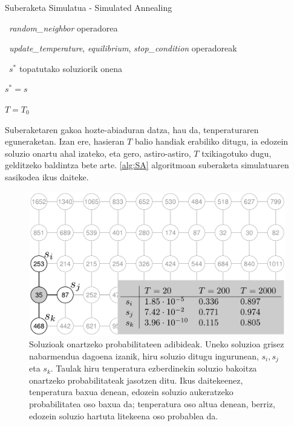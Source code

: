 \documentclass[eu]{ifirak}\usepackage[]{graphicx}\usepackage[]{color}
\begin{document}
\begin{ifalgorithm}[t]
\begin{ifpseudo}{Suberaketa Simulatua - Simulated Annealing}
\item \In\ \textit{random\_neighbor} operadorea
\item \In\ \textit{update\_temperature}, \textit{equilibrium}, \textit{stop\_condition} operadoreak
\item \Out\ $s^*$ topatutako soluziorik onena
\item $s^*=s$
\item $T=T_0$
\item {}
\item {}
\item {}
\item {}
\item {}
\item {}
\item {}
\item \TT{\EIf}
\item \TT{\Else}
\item {}
\item \T{\Done}
\item {}
\item \Done
\end{ifpseudo}
\caption{Suberaketa Simulatuaren sasikodea}\label{alg:SA}
\end{ifalgorithm}

Suberaketaren gakoa hozte-abiaduran datza, hau da, tenperaturaren eguneraketan. Izan ere, hasieran $T$ balio handiak erabiliko ditugu, ia edozein soluzio onartu ahal izateko, eta gero, astiro-astiro, $T$ txikiagotuko dugu, gelditzeko baldintza bete arte. \ref{alg:SA} algoritmoan suberaketa simulatuaren sasikodea ikus daiteke.

\begin{figure}[t]
\centering
\includegraphics[width=0.66\linewidth]{./Irudiak/example_boltzman_dist}
\caption{Soluzioak onartzeko probabilitateen adibideak. Uneko soluzioa grisez nabarmendua dagoena izanik, hiru soluzio ditugu ingurunean, $s_i,s_j$ eta $s_k$. Taulak hiru tenperatura ezberdinekin soluzio bakoitza onartzeko probabilitateak jasotzen ditu. Ikus daitekeenez, tenperatura baxua denean, edozein soluzio aukeratzeko probabilitatea oso baxua da; tenperatura oso altua denean, berriz, edozein soluzio hartuta litekeena oso probablea da.}
\label{fig:example_boltzman_dist}
\end{figure}
\end{document}

